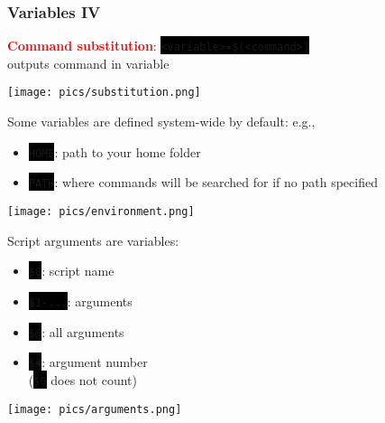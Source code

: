 \documentclass[unknownkeysallowed, 10pt, a4 paper, handout]{beamer}
\newcommand{\focus}[1]{\textbf{\textcolor{red}{#1}}}
\newcommand{\code}[1]{\colorbox{black}{\color{green}\texttt{#1}}}
\newcommand{\sidebyside}[5]{
  \begin{minipage}{#1\textwidth}
    #2
  \end{minipage} #3 \begin{minipage}{#4\textwidth}
    #5
  \end{minipage}
}
\begin{document}
\begin{frame}
  \begin{center}
    \frametitle{Variables IV}

    \sidebyside{0.40}{
      \centering
      \focus{Command substitution}:
      \code{<variable>=\$(<command>)}\\
      outputs command in variable
    }{\hfill}{0.56}{
      \begin{center}
        \texttt{[image: pics/substitution.png]}
      \end{center}
    }

    Some variables are defined system-wide by default: e.g.,

    \vspace{-2mm}

    \begin{itemize}
      \item \code{HOME}: path to your home folder
      \item \code{PATH}: where commands will be searched for if no path specified
    \end{itemize}

    \vspace{-3mm}

    \begin{center}
      \texttt{[image: pics/environment.png]}
    \end{center}

    \sidebyside{0.50}{
      Script arguments are variables:
      \begin{itemize}
        \item \code{\$0}: script name
        \item \code{\$1-...}: arguments
        \item \code{\$@}: all arguments
        \item \code{\$\#}: argument number\\
          (\code{\$0} does not count)
      \end{itemize}
    }{\hfill}{0.43}{
      \begin{center}
        \texttt{[image: pics/arguments.png]}
      \end{center}
    }
  \end{center}
\end{frame}
\end{document}
